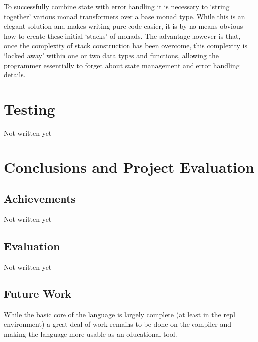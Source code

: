 \documentclass[12pt, a4paper]{report}
\begin{document}
To successfully combine state with error handling it is necessary to `string together' various monad
transformers over a base monad type. While this is an elegant solution and makes writing pure code
easier, it is by no means obvious how to create these initial `stacks' of monads. The advantage
however is that, once the complexity of stack construction has been overcome, this complexity is
`locked away' within one or two data types and functions, allowing the programmer essentially to
forget about state management and error handling details. 

\chapter{Testing}

Not written yet

\chapter{Conclusions and Project Evaluation}

\section{Achievements}
Not written yet

\section{Evaluation}
Not written yet

\section{Future Work}
While the basic core of the language is largely complete (at least in the repl environment) a great
deal of work remains to be done on the compiler and making the language more usable as an educational
tool.
\end{document}
